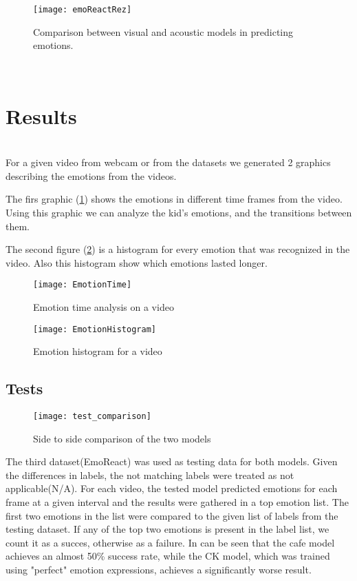 \documentclass[runningheads,a4paper,11pt]{report}
\begin{document}
 \begin{figure}
    	\centerline{\texttt{[image: emoReactRez]}}
   		\caption{Comparison between visual and acoustic models in predicting emotions.\cite{Nojavanasghari16}}
  \end{figure}

    \\

\section{Results}
\label{section:results}

\\
For a given video from webcam or from the datasets we generated 2 graphics describing the emotions from the videos.

The firs graphic (\ref{fig:EmotionTime}) shows the emotions in different time frames from the video. Using this graphic we can analyze the kid's emotions, and the transitions between them.

The second figure (\ref{fig:emotion_histogram_video})  is a histogram for every emotion that was recognized in the video. Also this histogram show which emotions lasted longer.


\begin{figure}[ht]
    \centering
    \texttt{[image: EmotionTime]}
    \caption{Emotion time analysis on a video}
    \label{fig:EmotionTime}
\end{figure}

\begin{figure}[ht]
    \centering
    \texttt{[image: EmotionHistogram]}
    \caption{Emotion histogram for a video}
    \label{fig:emotion_histogram_video}
\end{figure}

\subsection{Tests}

\begin{figure}[ht]
    \centering
    \texttt{[image: test\_comparison]}
    \caption{Side to side comparison of the two models}
    \label{fig:test_comparison}
\end{figure}

The third dataset(EmoReact) was used as testing data for both models. Given the differences in labels, the not matching labels were treated as not applicable(N/A). For each video, the tested model predicted emotions for each frame at a given interval and the results were gathered in a top emotion list. The first two emotions in the list were compared to the given list of labels from the testing dataset. If any of the top two emotions is present in the label list, we count it as a succes, otherwise as a failure.
In \label{test_comparison} can be seen that the cafe model achieves an almost 50\% success rate, while the CK model, which was trained using "perfect" emotion expressions, achieves a significantly worse result.
\end{document}

